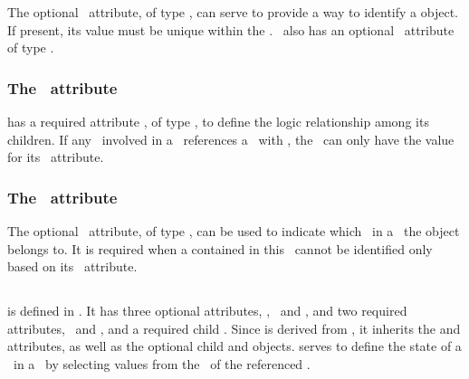 The optional \idAtt\ attribute, of type \SIdPT, can serve to provide a way to identify a \mBlockChangedBegin{\revTwentyTwentyMarch}  object\mBlockChangedEnd{\revTwentyTwentyMarch}. If present, \mBlockChangedBegin{\revTwentyTwentyMarch}its\mBlockChangedEnd{\revTwentyTwentyMarch} value must be unique within the \species. \SubListOfSpeciesFeatures\ also has an optional \nameAtt\ attribute of type \stringPT.

\subsubsection{The \relationAtt\ attribute}
\label{def:SubListOfSpeciesFeatures:relation}

\SubListOfSpeciesFeatures has a required attribute \relationAtt, of type \RelationPTWC, to define the logic relationship among its children. 
If any \speciesFeature\ involved in a \subListOfSpeciesFeatures\ references a \speciesFeatureTypeAtt\ with , the \subListOfSpeciesFeatures\ can only have the value  for its \relationAtt\ attribute. 

\subsubsection{The \componentAtt\ attribute}
\label{def:SubListOfSpeciesFeatures:component}

The optional \componentAtt\ attribute, of type \SIdRefPT, can be used to indicate which \componentWR\  \mBlockChangedBegin{\revTwentyTwentyMarch}in\mBlockChangedEnd{\revTwentyTwentyMarch} a \species\ the \mBlockChangedBegin{\revTwentyTwentyMarch} object\mBlockChangedEnd{\revTwentyTwentyMarch} belongs to. It is required when \mBlockChangedBegin{\revTwentyTwentyMarch}a \speciesFeature\mBlockChangedEnd{\revTwentyTwentyMarch} contained in this \subListOfSpeciesFeatures\ cannot be identified only based on its \speciesFeatureTypeAtt\ attribute.

\subsection{}
\label{def:SpeciesFeature}

 is defined in .  It has three optional attributes, \idAtt, \nameAtt\ and \componentAtt, and two required attributes, \speciesFeatureTypeAtt\ and \occurAtt, and a required child \listOfSpeciesFeatureValues. Since  is derived from , it inherits the  and  attributes, as well as the optional \mBlockChangedBegin{\revTwentyTwentyMarch}child\mBlockChangedEnd{\revTwentyTwentyMarch}  and  objects.  serves to define the state of a \component\ in a \species\ by selecting values from the \listOfPossibleSpeciesFeatureValues\ of the referenced \speciesFeatureType. 

